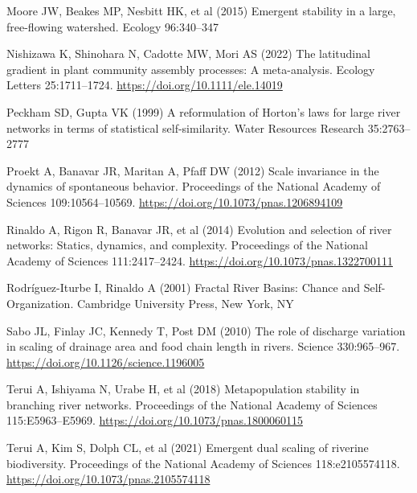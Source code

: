 \documentclass[
  12pt,
]{article}
\newlength{\cslhangindent}
\newlength{\cslentryspacingunit} %
\newenvironment{CSLReferences}[2] %
 {%
  \setlength{\parindent}{0pt}
  \ifodd #1
  \let\oldpar\par
  \def\par{\hangindent=\cslhangindent\oldpar}
  \fi
  \setlength{\parskip}{#2\cslentryspacingunit}
 }%
 {}
\begin{document}
\begin{CSLReferences}{1}{0}
\leavevmode{}%
Moore JW, Beakes MP, Nesbitt HK, et al (2015) Emergent stability in a large, free-flowing watershed. Ecology 96:340--347

\leavevmode{}%
Nishizawa K, Shinohara N, Cadotte MW, Mori AS (2022) The latitudinal gradient in plant community assembly processes: {A} meta-analysis. Ecology Letters 25:1711--1724. \url{https://doi.org/10.1111/ele.14019}

\leavevmode{}%
Peckham SD, Gupta VK (1999) A reformulation of {Horton}'s laws for large river networks in terms of statistical self-similarity. Water Resources Research 35:2763--2777

\leavevmode{}%
Proekt A, Banavar JR, Maritan A, Pfaff DW (2012) Scale invariance in the dynamics of spontaneous behavior. Proceedings of the National Academy of Sciences 109:10564--10569. \url{https://doi.org/10.1073/pnas.1206894109}

\leavevmode{}%
Rinaldo A, Rigon R, Banavar JR, et al (2014) Evolution and selection of river networks: {Statics}, dynamics, and complexity. Proceedings of the National Academy of Sciences 111:2417--2424. \url{https://doi.org/10.1073/pnas.1322700111}

\leavevmode{}%
Rodríguez-Iturbe I, Rinaldo A (2001) Fractal {River Basins}: {Chance} and {Self-Organization}. {Cambridge University Press}, {New York, NY}

\leavevmode{}%
Sabo JL, Finlay JC, Kennedy T, Post DM (2010) The role of discharge variation in scaling of drainage area and food chain length in rivers. Science 330:965--967. \url{https://doi.org/10.1126/science.1196005}

\leavevmode{}%
Terui A, Ishiyama N, Urabe H, et al (2018) Metapopulation stability in branching river networks. Proceedings of the National Academy of Sciences 115:E5963--E5969. \url{https://doi.org/10.1073/pnas.1800060115}

\leavevmode{}%
Terui A, Kim S, Dolph CL, et al (2021) Emergent dual scaling of riverine biodiversity. Proceedings of the National Academy of Sciences 118:e2105574118. \url{https://doi.org/10.1073/pnas.2105574118}


\end{CSLReferences}
\end{document}
